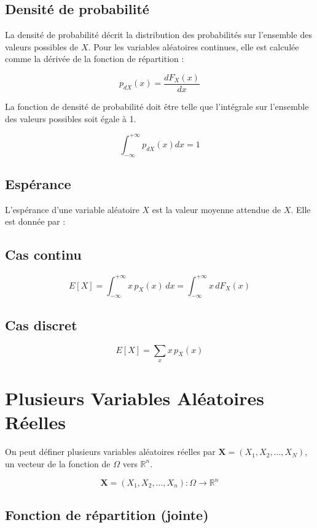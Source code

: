 \documentclass{article}
\begin{document}
\subsection{Densité de probabilité}

La densité de probabilité décrit la distribution des probabilités sur l'ensemble des valeurs possibles de $X$. Pour les variables aléatoires continues, elle est calculée comme la dérivée de la fonction de répartition :

\[
p_{dX}(x) = \frac{dF_X(x)}{dx}
\]

La fonction de densité de probabilité doit être telle que l'intégrale sur l'ensemble des valeurs possibles soit égale à 1.

\[
\int_{-\infty}^{+\infty}p_{dX}(x)dx = 1
\]

\subsection{Espérance}

L'espérance d'une variable aléatoire $X$ est la valeur moyenne attendue de $X$. Elle est donnée par :

\subsection{Cas continu}

\[
E[X] = \int_{-\infty}^{+\infty} x \, p_X(x) \, dx = \int_{-\infty}^{+\infty} x \, dF_X(x)
\]

\subsection{Cas discret}

\[
E[X] = \sum_{x} x \, p_X(x)
\]

\section{Plusieurs Variables Aléatoires Réelles}

On peut définer plusieurs variables aléatoires réelles par $ \mathbf{X} = (X_1, X_2, \dotsc, X_N) $, un vecteur de la fonction de $\Omega$ vers $\mathbb{R}^n$.

\[
\mathbf{X} = (X_1, X_2, \dotsc, X_n): \Omega \rightarrow \mathbb{R}^n
\]

\subsection{Fonction de répartition (jointe)}
\end{document}
